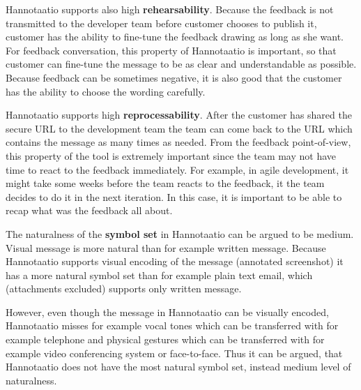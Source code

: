 \documentclass[english,12pt,a4paper,pdftex]{article}
\begin{document}
Hannotaatio supports also high \textbf{rehearsability}. Because the feedback is not transmitted to the developer team before customer chooses to publish it, customer has the ability to fine-tune the feedback drawing as long as she want. For feedback conversation, this property of Hannotaatio is important, so that customer can fine-tune the message to be as clear and understandable as possible. Because feedback can be sometimes negative, it is also good that the customer has the ability to choose the wording carefully.

Hannotaatio supports high \textbf{reprocessability}. After the customer has shared the secure \ac{URL} to the development team the team can come back to the \ac{URL} which contains the message as many times as needed. From the feedback point-of-view, this property of the tool is extremely important since the team may not have time to react to the feedback immediately. For example, in agile development, it might take some weeks before the team reacts to the feedback, it the team decides to do it in the next iteration. In this case, it is important to be able to recap what was the feedback all about.

The naturalness of the \textbf{symbol set} in Hannotaatio can be argued to be medium. Visual message is more natural than for example written message. Because Hannotaatio supports visual encoding of the message (annotated screenshot) it has a more natural symbol set than for example plain text email, which (attachments excluded) supports only written message.

However, even though the message in Hannotaatio can be visually encoded, Hannotaatio misses for example vocal tones which can be transferred with for example telephone and physical gestures which can be transferred with for example video conferencing system or face-to-face. Thus it can be argued, that Hannotaatio does not have the most natural symbol set, instead medium level of naturalness.
\end{document}
